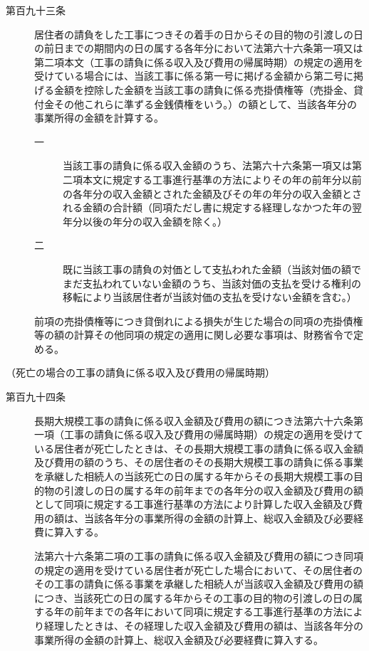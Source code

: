 \documentclass[twocolumn,a4j,10pt]{ltjtarticle}
\begin{document}
\begin{description}
\item[第百九十三条]居住者の請負をした工事につきその着手の日からその目的物の引渡しの日の前日までの期間内の日の属する各年分において法第六十六条第一項又は第二項本文（工事の請負に係る収入及び費用の帰属時期）の規定の適用を受けている場合には、当該工事に係る第一号に掲げる金額から第二号に掲げる金額を控除した金額を当該工事の請負に係る売掛債権等（売掛金、貸付金その他これらに準ずる金銭債権をいう。）の額として、当該各年分の事業所得の金額を計算する。
\begin{description}
\item[一]当該工事の請負に係る収入金額のうち、法第六十六条第一項又は第二項本文に規定する工事進行基準の方法によりその年の前年分以前の各年分の収入金額とされた金額及びその年の年分の収入金額とされる金額の合計額（同項ただし書に規定する経理しなかつた年の翌年分以後の年分の収入金額を除く。）
\item[二]既に当該工事の請負の対価として支払われた金額（当該対価の額でまだ支払われていない金額のうち、当該対価の支払を受ける権利の移転により当該居住者が当該対価の支払を受けない金額を含む。）
\end{description}
\item[]前項の売掛債権等につき貸倒れによる損失が生じた場合の同項の売掛債権等の額の計算その他同項の規定の適用に関し必要な事項は、財務省令で定める。
\end{description}
\noindent\hspace{10pt}（死亡の場合の工事の請負に係る収入及び費用の帰属時期）
\begin{description}
\item[第百九十四条]長期大規模工事の請負に係る収入金額及び費用の額につき法第六十六条第一項（工事の請負に係る収入及び費用の帰属時期）の規定の適用を受けている居住者が死亡したときは、その長期大規模工事の請負に係る収入金額及び費用の額のうち、その居住者のその長期大規模工事の請負に係る事業を承継した相続人の当該死亡の日の属する年からその長期大規模工事の目的物の引渡しの日の属する年の前年までの各年分の収入金額及び費用の額として同項に規定する工事進行基準の方法により計算した収入金額及び費用の額は、当該各年分の事業所得の金額の計算上、総収入金額及び必要経費に算入する。
\item[]法第六十六条第二項の工事の請負に係る収入金額及び費用の額につき同項の規定の適用を受けている居住者が死亡した場合において、その居住者のその工事の請負に係る事業を承継した相続人が当該収入金額及び費用の額につき、当該死亡の日の属する年からその工事の目的物の引渡しの日の属する年の前年までの各年において同項に規定する工事進行基準の方法により経理したときは、その経理した収入金額及び費用の額は、当該各年分の事業所得の金額の計算上、総収入金額及び必要経費に算入する。
\end{description}
\end{document}

